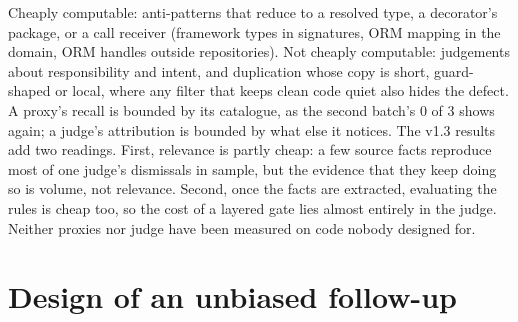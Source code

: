 \documentclass[10pt,a4paper]{article}
\begin{document}
Cheaply computable: anti-patterns that reduce to a resolved type, a decorator's package, or a call receiver (framework
types in signatures, ORM mapping in the domain, ORM handles outside repositories). Not cheaply computable:
judgements about responsibility and intent, and duplication whose copy is short, guard-shaped or local, where any
filter that keeps clean code quiet also hides the defect. A proxy's recall is bounded by its catalogue, as the second
batch's 0 of 3 shows again; a judge's attribution is bounded by what else it notices. The v1.3 results add two
readings. First, relevance is partly cheap: a few source facts reproduce most of one judge's dismissals in sample,
but the evidence that they keep doing so is volume, not relevance. Second, once the facts are extracted, evaluating
the rules is cheap too, so the cost of a layered gate lies almost entirely in the judge. Neither proxies nor judge
have been measured on code nobody designed for.

\section{Design of an unbiased follow-up}
\end{document}
